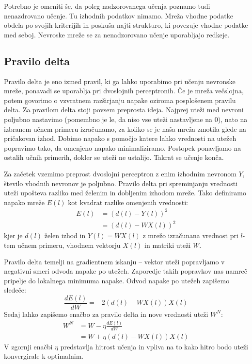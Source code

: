 \documentclass[mat1]{fmfdelo}
\begin{document}
Potrebno je omeniti še, da poleg nadzorovanega učenja poznamo tudi nenazdrovano učenje. Tu izhodnih podatkov nimamo. Mreža vhodne podatke obdela po svojih kriterijih in poskuša najti strukturo, ki povezuje vhodne podatke med seboj. Nevroske mreže se za nenadzorovano učenje uporabljajo redkeje.
\subsection{Pravilo delta}
Pravilo delta je eno izmed pravil, ki ga lahko uporabimo pri učenju nevronske mreže, ponavadi se uporablja pri dvoslojnih perceptronih. Če je mreža večslojna, potem govorimo o vzvratnem razširjanju napake oziroma posplošenem pravilu delta. Za pravilom delta stoji povsem preprosta ideja. Najprej uteži med nevroni poljubno nastavimo (pomembno je le, da niso vse uteži nastavljene na 0), nato na izbranem učnem primeru izračunamo, za koliko se je naša mreža zmotila glede na pričakovan izhod. Dobimo napako s pomočjo katere lahko vrednosti na utežeh popravimo tako, da omenjeno napako minimaliziramo. Postopek ponavljamo na ostalih učnih primerih, dokler se uteži ne ustalijo. Takrat se učenje konča.

Za začetek vzemimo preprost dvoslojni perceptron z enim izhodnim nevronom $Y$, število vhodnih nevronov je poljubno. Pravilo delta pri spreminjanju vrednosti uteži upošteva razliko med želenim in dobljenim izhodom mreže. Tako definiramo napako mreže $E(l)$ kot kvadrat razlike omenjenih vrednosti:
%
\begin{equation}
\begin{aligned}
E(l) &= (d(l)-Y(l))^2 \\
&= (d(l)-WX(l))^2
\label{eq:napaka}
\end{aligned}
\end{equation}
%
kjer je $d(l)$ želen izhod in $Y(l)= WX(l)$ z mrežo izračunana vrednost pri $l$-tem učnem primeru, vhodnem vektorju $X(l)$ in matriki uteži $W$.

Pravilo delta temelji na gradientnem iskanju -- vektor uteži popravljamo v negativni smeri odvoda napake po utežeh. Zaporedje takih popravkov nas namreč pripelje do lokalnega minimuma napake. Odvod napake po utežeh zapišemo sledeče:
%
\begin{equation*}
\frac{dE(l)}{dW}= -2(d(l)-WX(l))X(l)
\end{equation*}
%
Sedaj lahko zapišemo enačbo za pravilo delta in nove vrednosti uteži $W^{N}$:
%
\begin{equation}
\begin{aligned}
W^{N} &= W - \eta\frac{dE(l)}{dW} \\
&= W + \eta(d(l)-WX(l))X(l)
\label{utezi}
\end{aligned}
\end{equation}
%
V zgornji enačbi $\eta$ predstavlja hitrost učenja in vpliva na to kako hitro bodo uteži konvergirale k optimalnim. 
%
\\
\end{document}
